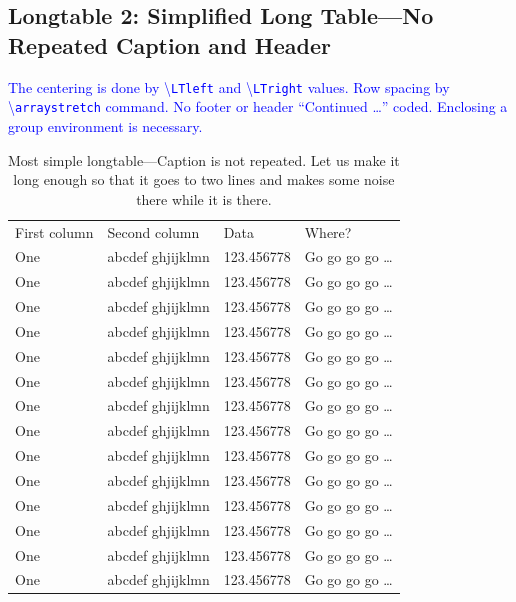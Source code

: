 \documentclass[phd]{ndsu-thesis-2022}
\newcommand\italk[1]{\textcolor{blue}{#1}}  %
\newcommand\cmd[1]{\textbackslash\texttt{#1}}  %
\begin{document}
\subsection{Longtable 2: Simplified Long Table---No Repeated Caption and Header}

\italk{The centering is done by \cmd{LTleft} and \cmd{LTright} values. Row spacing by \\\cmd{arraystretch} command. No footer or header ``Continued \ldots'' coded. Enclosing a group environment is necessary.}

\begingroup
\setlength{\LTleft}{1mm plus -1fill}%
\setlength{\LTright}{\LTleft}%
\renewcommand{\arraystretch}{0.5}%
\begin{longtable}{l l l l}
\captionsetup{width=\textwidth}
\caption{Most simple longtable---Caption is not repeated. Let us make it long enough so that it goes to two lines and makes some noise there while it is there.}\\[-20pt]%
\toprule
First column & Second column & Data & Where?\\
\midrule
One & abcdef ghjijklmn & 123.456778  & Go go go go \ldots \\
One & abcdef ghjijklmn & 123.456778  & Go go go go \ldots \\
One & abcdef ghjijklmn & 123.456778  & Go go go go \ldots \\
One & abcdef ghjijklmn & 123.456778  & Go go go go \ldots \\
One & abcdef ghjijklmn & 123.456778  & Go go go go \ldots \\
One & abcdef ghjijklmn & 123.456778  & Go go go go \ldots \\
One & abcdef ghjijklmn & 123.456778  & Go go go go \ldots \\
One & abcdef ghjijklmn & 123.456778  & Go go go go \ldots \\
One & abcdef ghjijklmn & 123.456778  & Go go go go \ldots \\
One & abcdef ghjijklmn & 123.456778  & Go go go go \ldots \\
One & abcdef ghjijklmn & 123.456778  & Go go go go \ldots \\
One & abcdef ghjijklmn & 123.456778  & Go go go go \ldots \\
One & abcdef ghjijklmn & 123.456778  & Go go go go \ldots \\
One & abcdef ghjijklmn & 123.456778  & Go go go go \ldots \\

\end{longtable}
\end{document}
